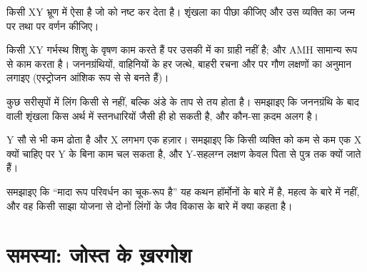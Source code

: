 \begin{exercise}[$\star\star$]\label{exo:g11:becoming-male-female:11}
किसी XY भ्रूण में ऐसा  है जो   को नष्ट कर देता है।
शृंखला का पीछा कीजिए और उस व्यक्ति का जन्म पर तथा  पर वर्णन कीजिए।
\end{exercise}

\begin{exercise}[$\star\star\star$]\label{exo:g11:becoming-male-female:12}
किसी XY गर्भस्थ शिशु के वृषण काम करते हैं पर उसकी  में
 का ग्राही नहीं है; और AMH सामान्य रूप से काम करता है।
जननग्रंथियों, वाहिनियों के हर जत्थे, बाहरी रचना और  पर गौण लक्षणों
का अनुमान लगाइए (एस्ट्रोजन आंशिक रूप से  से बनते हैं)।
\end{exercise}

\begin{exercise}[$\star\star\star$]\label{exo:g11:becoming-male-female:13}
कुछ सरीसृपों में लिंग किसी  से नहीं, बल्कि अंडे के ताप से तय होता
है। समझाइए कि जननग्रंथि के बाद वाली शृंखला किस अर्थ में स्तनधारियों जैसी ही
हो सकती है, और कौन-सा क़दम अलग है।
\end{exercise}

\begin{exercise}[$\star\star\star$]\label{exo:g11:becoming-male-female:14}
Y  सौ से भी कम  ढोता है और X लगभग एक हज़ार। समझाइए कि किसी
व्यक्ति को कम से कम एक X क्यों चाहिए पर Y के बिना काम चल सकता है, और
Y-सहलग्न लक्षण केवल पिता से पुत्र तक क्यों जाते हैं।
\end{exercise}

\begin{exercise}[$\star\star\star$]\label{exo:g11:becoming-male-female:15}
समझाइए कि ``मादा रूप परिवर्धन का चूक-रूप है'' यह कथन हॉर्मोनों के बारे में
है, महत्व के बारे में नहीं, और वह किसी साझा योजना से दोनों लिंगों के जैव
विकास के बारे में क्या कहता है।
\end{exercise}

\section{समस्या: जोस्त के ख़रगोश}

